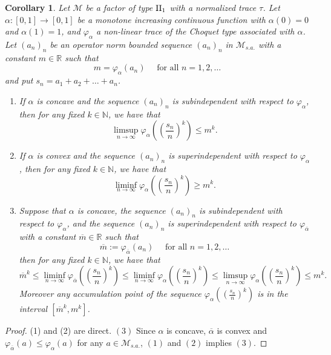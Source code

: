 \documentclass[a4paper,12pt]{amsart}
\newtheorem{corollary}[definition]{Corollary}
\newcommand{\M}{\mathcal{M}}
\newcommand{\R}{\mathbb{R}}
\newcommand{\N}{\mathbb{N}}
\begin{document}
\begin{corollary} \label{law of large numbers}
Let $\M$ be a factor of type ${\rm II}_1$ with a normalized trace $\tau$.  
Let $\alpha: [0,1]  \rightarrow [0, 1]$ be a monotone increasing continuous function with $\alpha(0) = 0$ 
and $\alpha(1) = 1$, and
$\varphi_{\alpha}$ a non-linear trace of the Choquet type associated with $\alpha$.  
Let $(a_n)_n$ be an operator norm bounded sequence $(a_n)_n$ in ${\M}_{s.a.}$ with a constant $m \in \R$ such that 
\[   m= \varphi_\alpha (a_n)  \quad \text{ for all } n=1,2, \ldots  \] 
and put $s_n = a_1 + a_2 + \dots +a_n$.
\begin{enumerate}
\item[(1)] If $\alpha$ is concave and the sequence $(a_n)_n$ is subindependent with respect to $\varphi_\alpha$, 
then for any fixed $k \in  \N$, we have that 
\[  \limsup _{n \to \infty}  \varphi_{\alpha}((\frac{s_n}{n})^k) \leq m^k .\]
\item[(2)] If $\alpha$ is convex and the sequence $(a_n)_n$ is superindependent with respect to $\varphi_\alpha$, 
then for any fixed $k \in  \N$, we have that 
\[  \liminf _{n \to \infty}  \varphi_{\alpha}((\frac{s_n}{n})^k) \geq m^k .\]
\item[(3)] Suppose that $\alpha$ is concave, the sequence $(a_n)_n$ is subindependent with respect to $\varphi_\alpha$, 
and the sequence $(a_n)_n$ is superindependent with respect to $\varphi_{\overline \alpha}$ with a constant 
$\overline{m} \in \R$ such that 
\[ {\overline  m} := \varphi_{\overline \alpha} (a_n)  \quad \text{ for all } n=1,2, \ldots  \] 
then for any fixed $k \in  \N$, we have that 
\[
{\overline m}^k \leq \liminf _{n \to \infty} \varphi_{\overline \alpha}((\frac{s_n}{n})^k) 
\leq \liminf _{n \to \infty}  \varphi_{\alpha}((\frac{s_n}{n})^k)  
\leq \limsup _{n \to \infty}  \varphi_{\alpha}((\frac{s_n}{n})^k)  \leq m^k. 
\] 
Moreover any accumulation point of the sequence $\varphi_{\alpha}((\frac{s_n}{n})^k)$ is in the interval 
$[{\overline m}^k, m^k]$. 
\end{enumerate}
\end{corollary}
\begin{proof} (1) and (2) are direct. 
$(3)$ Since $\alpha$ is concave,  $\overline \alpha$ is convex and  
 $\varphi_{\overline \alpha}(a) \leq \varphi_{\alpha}(a)$ for any $a \in {\M}_{s.a.}$, 
 $(1)$ and $(2)$ implies $(3)$. 
\end{proof}
\end{document}
